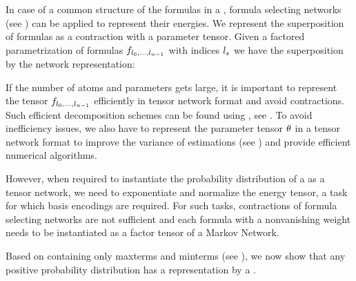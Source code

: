 In case of a common structure of the formulas in a \MarkovLogicNetwork{}, formula selecting networks (see ) can be applied to represent their energies.
We represent the superposition of formulas as a contraction with a parameter tensor.
Given a factored parametrization of formulas $f_{l_{0},\ldots,l_{n-1}}$ with indices $l_{s}$ we have the superposition by the network representation:
\begin{center}
    
\end{center}


If the number of atoms and parameters gets large, it is important to represent the tensor ${f_{l_{0},\ldots,l_{n-1}}}$ efficiently in tensor network format and avoid contractions.
Such efficient decomposition schemes can be found using \decompositionSparsity{}, see .
To avoid inefficiency issues, we also have to represent the parameter tensor $\theta$ in a tensor network format to improve the variance of estimations (see ) and provide efficient numerical algorithms.

However, when required to instantiate the probability distribution of a \MarkovLogicNetwork{} as a tensor network, we need to exponentiate and normalize the energy tensor, a task for which basis encodings are required.
For such tasks, contractions of formula selecting networks are not sufficient and each formula with a nonvanishing weight needs to be instantiated as a factor tensor of a Markov Network.






\label{sec:MLNMaxMintermRep}

Based on \MarkovLogicNetworks{} containing only maxterms and minterms (see ), we now show that any positive probability distribution has a representation by a \MarkovLogicNetwork{}.

